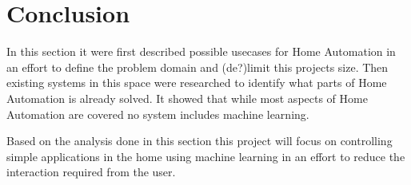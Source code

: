 \section{Conclusion}
In this section it were first described possible usecases for Home Automation in an effort to define the problem domain and (de?)limit this projects size. Then existing systems in this space were researched to identify what parts of Home Automation is already solved. It showed that while most aspects of Home Automation are covered no system includes machine learning.

Based on the analysis done in this section this project will focus on controlling simple applications in the home using machine learning in an effort to reduce the interaction required from the user.